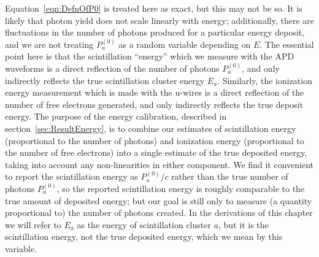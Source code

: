 Equation~\ref{eqn:DefnOfP0} is treated here as exact, but this may not be so.  It is likely that photon yield does not scale linearly with energy; additionally, there are fluctuations in the number of photons produced for a particular energy deposit, and we are not treating $P^{(0)}_a$ as a random variable depending on $E$.  The essential point here is that the scintillation ``energy'' which we measure with the APD waveforms is a direct reflection of the number of photons $P^{(0)}_a$, and only indirectly reflects the true scintillation cluster energy $E_a$.  Similarly, the ionization energy measurement which is made with the u-wires is a direct reflection of the number of free electrons generated, and only indirectly reflects the true deposit energy.  The purpose of the energy calibration, described in section~\ref{sec:ResultEnergy}, is to combine our estimates of scintillation energy (proportional to the number of photons) and ionization energy (proportional to the number of free electrons) into a single estimate of the true deposited energy, taking into account any non-linearities in either component.  We find it convenient to report the scintillation energy as $P^{(0)}_a/c$ rather than the true number of photons $P^{(0)}_a$, so the reported scintillation energy is roughly comparable to the true amount of deposited energy; but our goal is still only to measure (a quantity proportional to) the number of photons created.  In the derivations of this chapter we will refer to $E_a$ as the energy of scintillation cluster $a$, but it is the scintillation energy, not the true deposited energy, which we mean by this variable.

